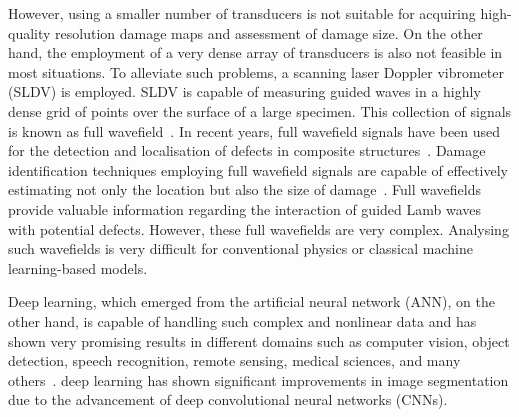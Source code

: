 \begin{sloppypar}
	However, using a smaller number of transducers is not suitable for acquiring high-quality resolution damage maps and assessment of damage size.
	On the other hand, the employment of a very dense array of transducers is also not feasible in most situations. 
	To alleviate such problems, a scanning laser Doppler vibrometer (SLDV) is employed.
	SLDV is capable of measuring guided waves in a highly dense grid of points over the surface of a large specimen.
	This collection of signals is known as full wavefield~\cite{Radzienski2019a}. 
	In recent years, full wavefield signals have been used for the detection and localisation of defects in composite
	structures~\cite{Radzienski2019a, Girolamo2018a, kudela2018impact,  rogge2013characterization}.
	Damage identification techniques employing full wavefield signals are capable of effectively estimating not only the location but also the size of damage~\cite{Girolamo2018a, kudela2018impact}.
	Full wavefields provide valuable information regarding the interaction of guided Lamb waves with potential defects.
	However, these full wavefields are very complex.
	Analysing such wavefields is very difficult for conventional physics or classical machine learning-based models.

	Deep learning, which emerged from the artificial neural network (ANN), on 
	the other hand, is capable of handling such complex and nonlinear data and 
	has shown very promising results in different domains such as computer 
	vision, object detection, speech recognition, remote sensing, medical 
	sciences, and many others~\cite{mohanty2016using, zhang2020well, 
	pashaei2020review}.
	\DIFdelbegin {}\DIFdelend \DIFaddbegin {}\DIFaddend deep learning has shown significant improvements in image 
	segmentation due to the advancement of deep convolutional neural networks 
	(CNNs).


\end{sloppypar}

